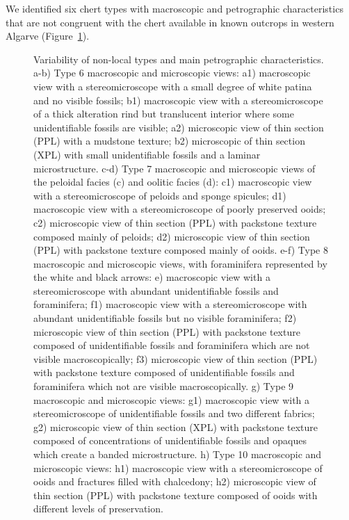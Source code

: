 \documentclass[
  a4paper,
  DIV=11,
  numbers=noendperiod]{scrreprt}
\begin{document}
We identified six chert types with macroscopic and petrographic
characteristics that are not congruent with the chert available in known
outcrops in western Algarve (Figure~\ref{fig-distance-types}).

\begin{figure}


\caption{\label{fig-distance-types}Variability of non-local types and
main petrographic characteristics. a-b) Type 6 macroscopic and
microscopic views: a1) macroscopic view with a stereomicroscope with a
small degree of white patina and no visible fossils; b1) macroscopic
view with a stereomicroscope of a thick alteration rind but translucent
interior where some unidentifiable fossils are visible; a2) microscopic
view of thin section (PPL) with a mudstone texture; b2) microscopic of
thin section (XPL) with small unidentifiable fossils and a laminar
microstructure. c-d) Type 7 macroscopic and microscopic views of the
peloidal facies (c) and oolitic facies (d): c1) macroscopic view with a
stereomicroscope of peloids and sponge spicules; d1) macroscopic view
with a stereomicroscope of poorly preserved ooids; c2) microscopic view
of thin section (PPL) with packstone texture composed mainly of peloids;
d2) microscopic view of thin section (PPL) with packstone texture
composed mainly of ooids. e-f) Type 8 macroscopic and microscopic views,
with foraminifera represented by the white and black arrows: e)
macroscopic view with a stereomicroscope with abundant unidentifiable
fossils and foraminifera; f1) macroscopic view with a stereomicroscope
with abundant unidentifiable fossils but no visible foraminifera; f2)
microscopic view of thin section (PPL) with packstone texture composed
of unidentifiable fossils and foraminifera which are not visible
macroscopically; f3) microscopic view of thin section (PPL) with
packstone texture composed of unidentifiable fossils and foraminifera
which not are visible macroscopically. g) Type 9 macroscopic and
microscopic views: g1) macroscopic view with a stereomicroscope of
unidentifiable fossils and two different fabrics; g2) microscopic view
of thin section (XPL) with packstone texture composed of concentrations
of unidentifiable fossils and opaques which create a banded
microstructure. h) Type 10 macroscopic and microscopic views: h1)
macroscopic view with a stereomicroscope of ooids and fractures filled
with chalcedony; h2) microscopic view of thin section (PPL) with
packstone texture composed of ooids with different levels of
preservation.}

\end{figure}%
\end{document}

